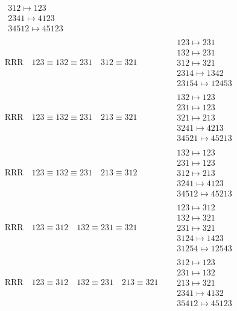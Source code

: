 \documentclass{article}
\begin{document}
\begin{align}
\begin{matrix}
312 \mapsto 123
\\
2341 \mapsto 4123
\\
34512 \mapsto 45123
\end{matrix}
\\
\text{RRR}
\quad
123\equiv132\equiv231
\quad
312\equiv321
\quad
&
\begin{matrix}
123 \mapsto 231
\\
132 \mapsto 231
\\
312 \mapsto 321
\\
2314 \mapsto 1342
\\
23154 \mapsto 12453
\end{matrix}
\\
\text{RRR}
\quad
123\equiv132\equiv231
\quad
213\equiv321
\quad
&
\begin{matrix}
132 \mapsto 123
\\
231 \mapsto 123
\\
321 \mapsto 213
\\
3241 \mapsto 4213
\\
34521 \mapsto 45213
\end{matrix}
\\
\text{RRR}
\quad
123\equiv132\equiv231
\quad
213\equiv312
\quad
&
\begin{matrix}
132 \mapsto 123
\\
231 \mapsto 123
\\
312 \mapsto 213
\\
3241 \mapsto 4123
\\
34512 \mapsto 45213
\end{matrix}
\\
\text{RRR}
\quad
123\equiv312
\quad
132\equiv231\equiv321
\quad
&
\begin{matrix}
123 \mapsto 312
\\
132 \mapsto 321
\\
231 \mapsto 321
\\
3124 \mapsto 1423
\\
31254 \mapsto 12543
\end{matrix}
\\
\text{RRR}
\quad
123\equiv312
\quad
132\equiv231
\quad
213\equiv321
\quad
&
\begin{matrix}
312 \mapsto 123
\\
231 \mapsto 132
\\
213 \mapsto 321
\\
2341 \mapsto 4132
\\
35412 \mapsto 45123
\end{matrix}
\\

\end{align}
\end{document}
